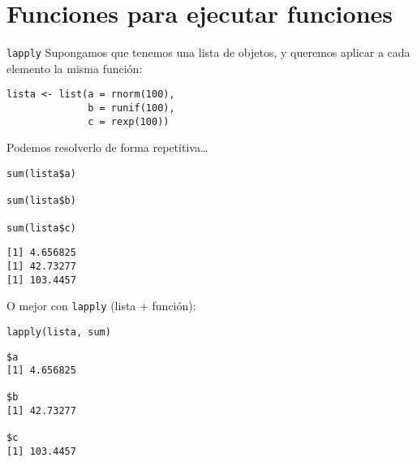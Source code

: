 \documentclass[xcolor={usenames,svgnames,dvipsnames}]{beamer}
\begin{document}
\section{Funciones para ejecutar funciones}
\label{sec:orgc9aa77e}
\begin{frame}[label={sec:orge4c508e},fragile]{\texttt{lapply}}
 Supongamos que tenemos una lista de objetos, y queremos aplicar a cada elemento la misma función:
\lstset{language=r,label= ,caption= ,captionpos=b,numbers=none}
\begin{lstlisting}
lista <- list(a = rnorm(100),
              b = runif(100),
              c = rexp(100))
\end{lstlisting}

Podemos resolverlo de forma repetitiva\ldots{}
\lstset{language=r,label= ,caption= ,captionpos=b,numbers=none}
\begin{lstlisting}
sum(lista$a)

sum(lista$b)

sum(lista$c)
\end{lstlisting}

\begin{verbatim}
[1] 4.656825
[1] 42.73277
[1] 103.4457
\end{verbatim}


O mejor con \texttt{lapply} (lista + función):
\lstset{language=r,label= ,caption= ,captionpos=b,numbers=none}
\begin{lstlisting}
lapply(lista, sum)
\end{lstlisting}

\begin{verbatim}
$a
[1] 4.656825

$b
[1] 42.73277

$c
[1] 103.4457
\end{verbatim}
\end{frame}
\end{document}
